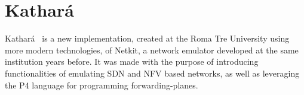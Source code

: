 
\chapter{Kathará}
\label{ch:kathara}

Kathará~\cite{kathara} is a new implementation, created at the Roma Tre University using more modern technologies, of Netkit, a network emulator developed at the same institution years before.
It was made with the purpose of introducing functionalities of emulating SDN and NFV based networks, as well as leveraging the P4 language for programming forwarding-planes.










